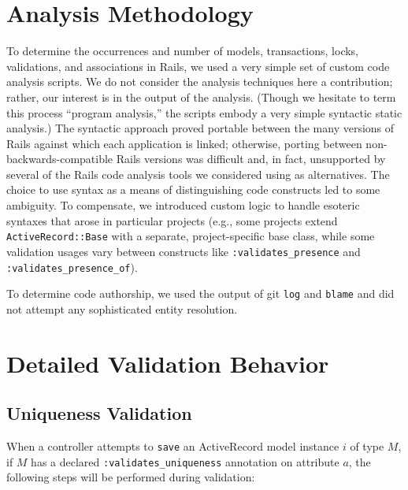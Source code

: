 \small

\section{Analysis Methodology}

\label{sec:appendix-methodology}

To determine the occurrences and number of models, transactions, locks, validations, and associations in Rails, we used a very simple set of custom code analysis scripts. We do not consider the analysis techniques here a contribution; rather, our interest is in the output of the analysis.  (Though we hesitate to term this process ``program analysis,'' the scripts embody a very simple syntactic static analysis.) The syntactic approach proved portable between the many versions of Rails against which each application is linked; otherwise, porting between non-backwards-compatible Rails versions was difficult and, in fact, unsupported by several of the Rails code analysis tools we considered using as alternatives. The choice to use syntax as a means of distinguishing code constructs led to some ambiguity. To compensate, we introduced custom logic to handle esoteric syntaxes that arose in particular projects (e.g., some projects extend \texttt{ActiveRecord::Base} with a separate, project-specific base class, while some validation usages vary between constructs like \texttt{:validates\_presence} and \texttt{:validates\_presence\_of}).

To determine code authorship, we used the output of git \texttt{log} and \texttt{blame} and did not attempt any sophisticated entity resolution.

\section{Detailed Validation Behavior}

\subsection{Uniqueness Validation}
\label{sec:appendix-uniqueness-behavior}

When a controller attempts to \texttt{save} an ActiveRecord model instance $i$ of type $M$, if $M$ has a declared \texttt{:validates\_uniqueness} annotation on attribute $a$, the following steps will be performed during validation:

